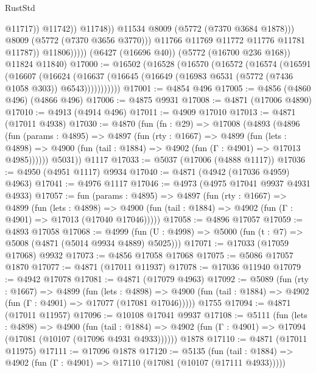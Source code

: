 \begin{lexlean}{RustStd}
\begin{coremodule}
{\begin{coremodule}
{{{{{{{{{{{{{{{{{{{{{{{{{{{{{                                    @11717))
                                @11742))
                            @11748))
                        @11534
                        @8009
                        (@5772 (@7370 @3684 @1878)))
                      @8009
                      (@5772 (@7370 @3656 @3770)))
                    @11766
                    @11769
                    @11772
                    @11776
                    @11781
                    @11787))
                @11806)))))
      (@6427 (@16696 @40))
      (@5772 (@16700 @236 @168))
      @11824
      @11840)
@17000 := @16502
    (@16528
      (@16570
        (@16572
          (@16574
            (@16591
              (@16607
                (@16624
                  (@16637 (@16645 (@16649 (@16983 @6531 (@5772 (@7436 @1058 @303)) @6543)))))))))))
@17001 := @4854 @496
@17005 := @4856 (@4860 @496) (@4866 @496)
@17006 := @4875 @9931
@17008 := @4871 (@17006 @4890)
@17010 := @4913 (@4914 @496)
@17011 := @4909 @17010
@17013 := @4871 (@17011 @4938)
@17030 := @4870
    (fun (fn : @29) =>
    @17008
      (@4893
        (@4896
          (fun (params : @4895) =>
          @4897
            (fun (rty : @1667) =>
            @4899
              (fun (lets : @4898) =>
              @4900 (fun (tail : @1884) => @4902 (fun (Γ : @4901) => @17013 @4985))))))
        @5031))
    @1117
@17033 := @5037 (@17006 (@4888 @1117))
@17036 := @4950 (@4951 @1117) @9934
@17040 := @4871 (@4942 (@17036 @4959) @4963)
@17041 := @4976 @1117
@17046 := @4973 (@4975 @17041 @9937 @4931 @4933)
@17057 := fun (params : @4895) =>
  @4897
    (fun (rty : @1667) =>
    @4899
      (fun (lets : @4898) =>
      @4900 (fun (tail : @1884) => @4902 (fun (Γ : @4901) => @17013 (@17040 @17046)))))
@17058 := @4896 @17057
@17059 := @4893 @17058
@17068 := @4999 (fun (U : @4998) => @5000 (fun (t : @7) => @5008 (@4871 (@5014 @9934 @4889) @5025)))
@17071 := @17033 (@17059 @17068) @9932
@17073 := @4856 @17058 @17068
@17075 := @5086 @17057 @1870
@17077 := @4871 (@17011 @11937)
@17078 := @17036 @11940
@17079 := @4942 @17078
@17081 := @4871 (@17079 @4963)
@17092 := @5089
    (fun (rty : @1667) =>
    @4899
      (fun (lets : @4898) =>
      @4900 (fun (tail : @1884) => @4902 (fun (Γ : @4901) => @17077 (@17081 @17046)))))
    @1755
@17094 := @4871 (@17011 @11957)
@17096 := @10108 @17041 @9937
@17108 := @5111
    (fun (lets : @4898) =>
    @4900
      (fun (tail : @1884) =>
      @4902 (fun (Γ : @4901) => @17094 (@17081 (@10107 (@17096 @4931 @4933))))))
    @1878
@17110 := @4871 (@17011 @11975)
@17111 := @17096 @1878
@17120 := @5135
    (fun (tail : @1884) => @4902 (fun (Γ : @4901) => @17110 (@17081 (@10107 (@17111 @4933)))))
}}}}}}}}}}}}}}}}}}}}}}}}}}}}}
\end{coremodule}}
\end{coremodule}
\end{lexlean}
